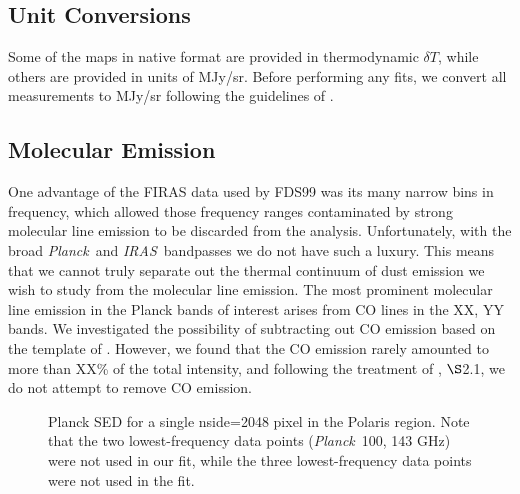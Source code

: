 \documentclass{emulateapj}
\newcommand{\IRAS}{{\it IRAS}}
\newcommand{\PLANCK}{{\it Planck}}
\begin{document}
\subsection{Unit Conversions}

Some of the maps in native format are provided in thermodynamic $\delta T$, 
while others are provided in units of MJy/sr. Before performing any fits, 
we convert all measurements to MJy/sr following the guidelines of \cite{planckresponse}.


\subsection{Molecular Emission}
One advantage of the FIRAS data used by FDS99 was its many narrow bins in 
frequency, which allowed those frequency ranges contaminated by strong 
molecular line emission to be discarded from the analysis. Unfortunately, with 
the broad \PLANCK~and \IRAS~bandpasses we do not have such a luxury. This means
 that we cannot truly separate out the thermal continuum of dust emission we 
wish to study from the molecular line emission. The most prominent molecular 
line emission in the Planck bands of interest arises from CO lines in the XX, 
YY bands. We investigated the possibility of subtracting out CO emission based 
on the template of \cite{planckco}. However, we found that the CO emission
rarely amounted to more than XX\% of the total intensity, and following
the treatment of \cite{planckdust}, $\S$2.1, we do not attempt to remove CO
emission.


\begin{figure}
\begin{center}
\caption{\label{fig:sed} Planck SED for a single nside=2048 pixel in the 
Polaris region. Note that the two lowest-frequency data points (\PLANCK~100, 
143 GHz) were not used in our fit, while the three lowest-frequency data
points were not used in the \cite{planckdust} fit.}
\end{center}
\end{figure}
\end{document}
